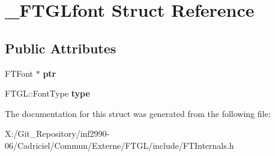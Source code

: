 \hypertarget{struct___f_t_g_lfont}{\section{\-\_\-\-F\-T\-G\-Lfont Struct Reference}
\label{struct___f_t_g_lfont}
}
\subsection*{Public Attributes}
\begin{DoxyCompactItemize}
\item 
\hypertarget{struct___f_t_g_lfont_a8bc834719ce209cd1ecc385b75e363b2}{F\-T\-Font $\ast$ {\bfseries ptr}}\label{struct___f_t_g_lfont_a8bc834719ce209cd1ecc385b75e363b2}

\item 
\hypertarget{struct___f_t_g_lfont_a1809096d837d4099e0470aa83a061ada}{F\-T\-G\-L\-::\-Font\-Type {\bfseries type}}\label{struct___f_t_g_lfont_a1809096d837d4099e0470aa83a061ada}

\end{DoxyCompactItemize}


The documentation for this struct was generated from the following file\-:\begin{DoxyCompactItemize}
\item 
X\-:/\-Git\-\_\-\-Repository/inf2990-\/06/\-Cadriciel/\-Commun/\-Externe/\-F\-T\-G\-L/include/F\-T\-Internals.\-h\end{DoxyCompactItemize}
